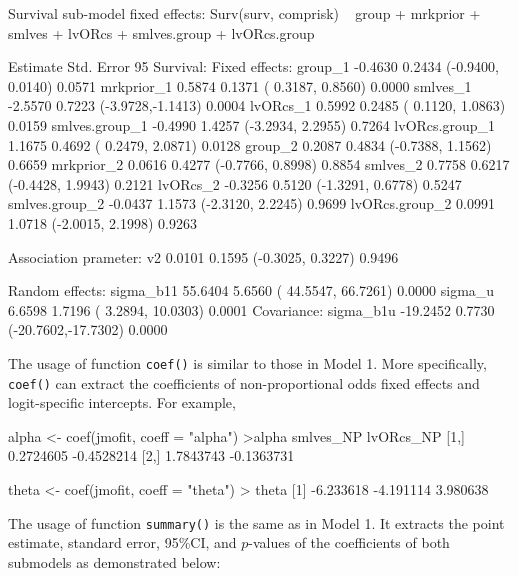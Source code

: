 \begin{example}
Survival sub-model fixed effects:  Surv(surv, comprisk) ~ group + mrkprior + smlves + lvORcs +
smlves.group + lvORcs.group

                  Estimate   Std. Error       95%
Survival:
 Fixed effects:
  group_1        -0.4630      0.2434      (-0.9400, 0.0140)      0.0571
  mrkprior_1     0.5874       0.1371      ( 0.3187, 0.8560)      0.0000
  smlves_1       -2.5570      0.7223      (-3.9728,-1.1413)      0.0004
  lvORcs_1       0.5992       0.2485      ( 0.1120, 1.0863)      0.0159
  smlves.group_1 -0.4990      1.4257      (-3.2934, 2.2955)      0.7264
  lvORcs.group_1 1.1675       0.4692      ( 0.2479, 2.0871)      0.0128
  group_2        0.2087       0.4834      (-0.7388, 1.1562)      0.6659
  mrkprior_2     0.0616       0.4277      (-0.7766, 0.8998)      0.8854
  smlves_2       0.7758       0.6217      (-0.4428, 1.9943)      0.2121
  lvORcs_2       -0.3256      0.5120      (-1.3291, 0.6778)      0.5247
  smlves.group_2 -0.0437      1.1573      (-2.3120, 2.2245)      0.9699
  lvORcs.group_2 0.0991       1.0718      (-2.0015, 2.1998)      0.9263

Association prameter:
  v2             0.0101       0.1595      (-0.3025, 0.3227)      0.9496

Random effects:
  sigma_b11      55.6404       5.6560      ( 44.5547, 66.7261)      0.0000
  sigma_u        6.6598       1.7196      ( 3.2894, 10.0303)      0.0001
 Covariance:
  sigma_b1u      -19.2452      0.7730      (-20.7602,-17.7302)      0.0000
\end{example}

The usage of function \texttt{coef()} is similar to those in Model 1. More specifically, \texttt{coef()} can extract the coefficients of non-proportional odds fixed effects and logit-specific intercepts. For example,

\begin{example}
alpha <- coef(jmofit, coeff = "alpha")
>alpha
     smlves_NP  lvORcs_NP
[1,] 0.2724605 -0.4528214
[2,] 1.7843743 -0.1363731

theta <- coef(jmofit, coeff = "theta")
> theta
[1] -6.233618 -4.191114  3.980638
\end{example}

The usage of function \texttt{summary()} is the same as in Model 1. It extracts the point estimate, standard error, 95\%CI, and $p$-values of the coefficients of both submodels as demonstrated below:

